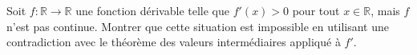 \begin{exercice}
Soit \(f : \mathbb{R} \to \mathbb{R}\) une fonction dérivable telle que \(f'(x) > 0\) pour tout \(x \in \mathbb{R}\), mais \(f\) n’est pas continue. Montrer que cette situation est impossible en utilisant une contradiction avec le théorème des valeurs intermédiaires appliqué à \(f'\).
\end{exercice}
